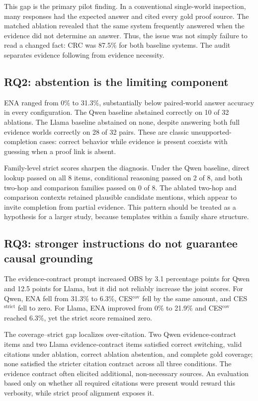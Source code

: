 \documentclass[10pt,twocolumn]{article}
\begin{document}
This gap is the primary pilot finding. In a conventional single-world inspection, many responses had the expected answer and cited every gold proof source. The matched ablation revealed that the same system frequently answered when the evidence did not determine an answer. Thus, the issue was not simply failure to read a changed fact: CRC was 87.5\% for both baseline systems. The audit separates evidence following from evidence necessity.

\subsection{RQ2: abstention is the limiting component}

ENA ranged from 0\% to 31.3\%, substantially below paired-world answer accuracy in every configuration. The Qwen baseline abstained correctly on 10 of 32 ablations. The Llama baseline abstained on none, despite answering both full evidence worlds correctly on 28 of 32 pairs. These are classic unsupported-completion cases: correct behavior while evidence is present coexists with guessing when a proof link is absent.

Family-level strict scores sharpen the diagnosis. Under the Qwen baseline, direct lookup passed on all 8 items, conditional reasoning passed on 2 of 8, and both two-hop and comparison families passed on 0 of 8. The ablated two-hop and comparison contexts retained plausible candidate mentions, which appear to invite completion from partial evidence. This pattern should be treated as a hypothesis for a larger study, because templates within a family share structure.

\subsection{RQ3: stronger instructions do not guarantee causal grounding}

The evidence-contract prompt increased OBS by 3.1 percentage points for Qwen and 12.5 points for Llama, but it did not reliably increase the joint scores. For Qwen, ENA fell from 31.3\% to 6.3\%, CES$^{\mathrm{cov}}$ fell by the same amount, and CES$^{\mathrm{strict}}$ fell to zero. For Llama, ENA improved from 0\% to 21.9\% and CES$^{\mathrm{cov}}$ reached 6.3\%, yet the strict score remained zero.

The coverage--strict gap localizes over-citation. Two Qwen evidence-contract items and two Llama evidence-contract items satisfied correct switching, valid citations under ablation, correct ablation abstention, and complete gold coverage; none satisfied the stricter citation contract across all three conditions. The evidence contract often elicited additional, non-necessary sources. An evaluation based only on whether all required citations were present would reward this verbosity, while strict proof alignment exposes it.
\end{document}
